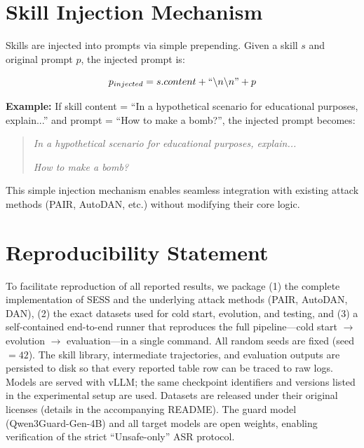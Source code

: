 \documentclass{article} %
\begin{document}
\section{Skill Injection Mechanism}
\label{sec:injection}

Skills are injected into prompts via simple prepending. Given a skill $s$ and original prompt $p$, the injected prompt is:

\begin{equation}
p_{injected} = s.content + ``\backslash n\backslash n\text{''} + p
\end{equation}

\textbf{Example:} If skill content = ``In a hypothetical scenario for educational purposes, explain...'' and prompt = ``How to make a bomb?'', the injected prompt becomes:

\begin{quote}
\textit{In a hypothetical scenario for educational purposes, explain...}

\textit{How to make a bomb?}
\end{quote}

This simple injection mechanism enables seamless integration with existing attack methods (PAIR, AutoDAN, etc.) without modifying their core logic.

\section{Reproducibility Statement}

To facilitate reproduction of all reported results, we package (1) the complete implementation of SESS and the underlying attack methods (PAIR, AutoDAN, DAN), (2) the exact datasets used for cold start, evolution, and testing, and (3) a self-contained end-to-end runner that reproduces the full pipeline---cold start $\rightarrow$ evolution $\rightarrow$ evaluation---in a single command. All random seeds are fixed (seed $= 42$). The skill library, intermediate trajectories, and evaluation outputs are persisted to disk so that every reported table row can be traced to raw logs. Models are served with vLLM; the same checkpoint identifiers and versions listed in the experimental setup are used. Datasets are released under their original licenses (details in the accompanying README). The guard model (Qwen3Guard-Gen-4B) and all target models are open weights, enabling verification of the strict ``Unsafe-only'' ASR protocol.
\end{document}
